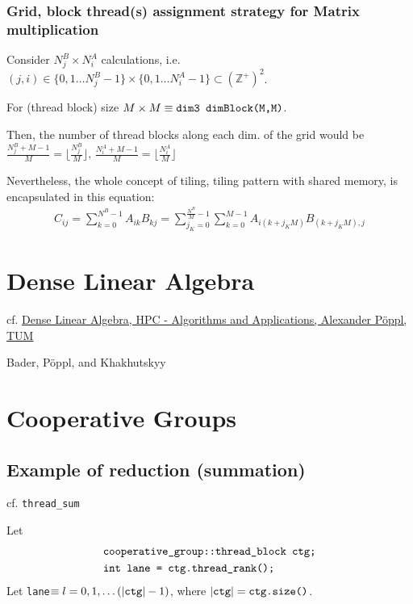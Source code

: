 \documentclass[10pt]{amsart}
\begin{document}
\begin{multicols*}{2}
\subsubsection{Grid, block thread(s) assignment strategy for Matrix multiplication} 

Consider $N_j^B \times N_i^A$ calculations, i.e. $(j,i) \in \lbrace 0,1\dots N_j^B - 1\rbrace \times \lbrace 0 ,1\dots N_i^A -1\rbrace \subset (\mathbb{Z}^+)^2 $.  

For (thread block) size $M\times M \equiv \verb|dim3 dimBlock(M,M)|$.  

Then, the number of thread blocks along each dim. of the grid would be $\frac{N_j^B+M-1}{M} = \lfloor \frac{N_j^B}{M} \rfloor , \, \frac{N_i^A + M-1}{M} = \lfloor \frac{N_i^A}{M} \rfloor $  

Nevertheless, the whole concept of tiling, tiling pattern with shared memory, is encapsulated in this equation:
\begin{equation}
\begin{gathered}
	C_{ij} = \sum_{k=0}^{N^B-1} A_{ik} B_{kj} = \sum_{j_K=0}^{\frac{N^B}{M}-1} \sum_{k=0}^{M-1} A_{i(k+j_KM)}B_{(k+j_KM), j}
\end{gathered}
\end{equation}



\section{Dense Linear Algebra}

cf. \href{https://www5.in.tum.de/lehre/vorlesungen/hpc/WS16/tutorial/sparse_02.pdf}{Dense Linear Algebra, HPC - Algorithms and Applications, Alexander P\"oppl, TUM}


Bader, P\"{o}ppl, and Khakhutskyy \cite{BaPK2016}

\section{Cooperative Groups}  

\subsection{Example of reduction (summation)}  

cf. \verb|thread_sum|  

Let 
\[
\begin{aligned} 
& \verb|cooperative_group::thread_block ctg;|  \\
& \verb|int lane = ctg.thread_rank();|
\end{aligned}
\]
Let \verb|lane|$\equiv l = 0,1,\dots ( |\verb|ctg||-1)$, where $|\verb|ctg|| = \verb|ctg.size()|$.  


\end{multicols*}
\end{document}
